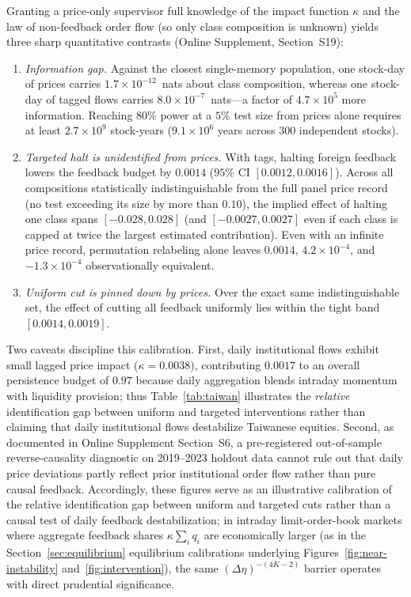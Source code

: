 \documentclass[11pt,letterpaper]{article}
\theoremstyle{definition}
\begin{document}
Granting a price-only supervisor full knowledge of the impact function $\kappa$ and the law of non-feedback order flow (so only class composition is unknown) yields three sharp quantitative contrasts (Online Supplement, Section~S19):
\begin{enumerate}
  \item \emph{Information gap.} Against the closest single-memory population, one stock-day of prices carries $1.7 \times 10^{-12}$~nats about class composition, whereas one stock-day of tagged flows carries $8.0 \times 10^{-7}$~nats—a factor of $4.7 \times 10^5$ more information. Reaching $80\%$ power at a $5\%$ test size from prices alone requires at least $2.7 \times 10^9$ stock-years ($9.1 \times 10^6$ years across 300 independent stocks).
  \item \emph{Targeted halt is unidentified from prices.} With tags, halting foreign feedback lowers the feedback budget by $0.0014$ ($95\%$ CI $[0.0012, 0.0016]$). Across all compositions statistically indistinguishable from the full panel price record (no test exceeding its size by more than $0.10$), the implied effect of halting one class spans $[-0.028, 0.028]$ (and $[-0.0027, 0.0027]$ even if each class is capped at twice the largest estimated contribution). Even with an infinite price record, permutation relabeling alone leaves $0.0014$, $4.2 \times 10^{-4}$, and $-1.3 \times 10^{-4}$ observationally equivalent.
  \item \emph{Uniform cut is pinned down by prices.} Over the exact same indistinguishable set, the effect of cutting all feedback uniformly lies within the tight band $[0.0014, 0.0019]$.
\end{enumerate}

Two caveats discipline this calibration. First, daily institutional flows exhibit small lagged price impact ($\kappa = 0.0038$), contributing $0.0017$ to an overall persistence budget of $0.97$ because daily aggregation blends intraday momentum with liquidity provision; thus Table~\ref{tab:taiwan} illustrates the \emph{relative} identification gap between uniform and targeted interventions rather than claiming that daily institutional flows destabilize Taiwanese equities. Second, as documented in Online Supplement Section~S6, a pre-registered out-of-sample reverse-causality diagnostic on 2019--2023 holdout data cannot rule out that daily price deviations partly reflect prior institutional order flow rather than pure causal feedback. Accordingly, these figures serve as an illustrative calibration of the relative identification gap between uniform and targeted cuts rather than a causal test of daily feedback destabilization; in intraday limit-order-book markets where aggregate feedback shares $\kappa \sum_i q_i$ are economically larger (as in the Section~\ref{sec:equilibrium} equilibrium calibrations underlying Figures~\ref{fig:near-instability} and~\ref{fig:intervention}), the same $(\Delta\eta)^{-(4K-2)}$ barrier operates with direct prudential significance.
\end{document}

